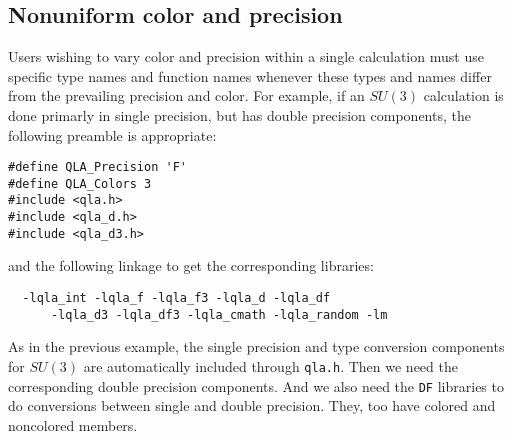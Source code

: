 \documentclass{article}
\begin{document}
\subsection{Nonuniform color and precision}

Users wishing to vary color and precision within a single calculation
must use specific type names and function names whenever these types
and names differ from the prevailing precision and color.  For
example, if an $SU(3)$ calculation is done primarly in single
precision, but has double precision components, the following preamble
is appropriate:
%
\begin{verbatim}
#define QLA_Precision 'F'
#define QLA_Colors 3
#include <qla.h>
#include <qla_d.h>
#include <qla_d3.h>
\end{verbatim}
%
and the following linkage to get the corresponding libraries:
%
\begin{verbatim}
  -lqla_int -lqla_f -lqla_f3 -lqla_d -lqla_df 
      -lqla_d3 -lqla_df3 -lqla_cmath -lqla_random -lm
\end{verbatim}
%
As in the previous example, the single precision and type conversion
components for $SU(3)$ are automatically included through {\tt qla.h}.
Then we need the corresponding double precision components.  And we
also need the {\tt DF} libraries to do conversions between single and
double precision.  They, too have colored and noncolored members.
\end{document}
